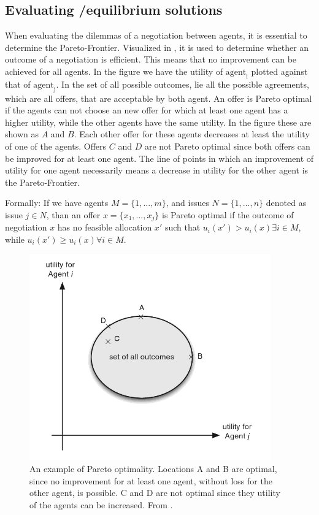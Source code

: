 \subsection{Evaluating /equilibrium solutions}
When evaluating the dilemmas of a negotiation between agents, it is essential to determine the Pareto-Frontier. Visualized in , it is used to determine whether an outcome of a negotiation is efficient. This means that no improvement can be achieved for all agents. In the figure we have the utility of $\text{agent}_\text{i}$ plotted against that of  $\text{agent}_\text{j}$. In the set of all possible outcomes, lie all the possible agreements, which are all offers, that are acceptable by both agent. An offer is Pareto optimal if the agents can not choose an new offer for which at least one agent has a higher utility, while the other agents have the same utility. In the figure these are shown as $A$ and $B$. Each other offer for these agents decreases at least the utility of one of the agents. Offers $C$ and $D$ are not Pareto optimal since both offers can be improved for at least one agent. The line of points in which an improvement of utility for one agent necessarily means a decrease in utility for the other agent is the Pareto-Frontier. 

Formally: If we have agents $M = \{1,...,m\}$, and issues $N = \{1,...,n\}$ denoted as issue $j\in N$, than an offer $x = \{x_1, ..., x_j\}$ is Pareto optimal if the outcome of negotiation $x$ has no feasible allocation $x'$ such that $u_i(x')> u_i(x) \exists i \in M$, while $u_i(x')\geq u_i(x) \forall i \in M$. 

\begin{figure}[h]
	\centering
	\includegraphics[width=0.7\linewidth]{img/parito_optimal.png}
	\caption{An example of Pareto optimality. Locations A and B are optimal, since no improvement for at least one agent, without loss for the other agent, is possible. C and D are not optimal since they utility of the agents can be increased. From \citet{fatima2014principles}.}
	\label{fig:paritooptimal}
\end{figure}

